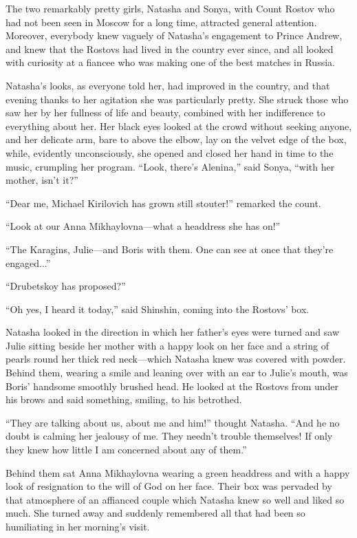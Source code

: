 The two remarkably pretty girls, Natasha and Sonya, with Count
Rostov who had not been seen in Moscow for a long time, attracted
general attention. Moreover, everybody knew vaguely of Natasha's
engagement to Prince Andrew, and knew that the Rostovs had lived
in the country ever since, and all looked with curiosity at a
fiancee who was making one of the best matches in Russia.

Natasha's looks, as everyone told her, had improved in the
country, and that evening thanks to her agitation she was
particularly pretty. She struck those who saw her by her fullness
of life and beauty, combined with her indifference to everything
about her. Her black eyes looked at the crowd without seeking
anyone, and her delicate arm, bare to above the elbow, lay on the
velvet edge of the box, while, evidently unconsciously, she
opened and closed her hand in time to the music, crumpling her
program. ``Look, there's Alenina,'' said Sonya, ``with her
mother, isn't it?''

``Dear me, Michael Kirilovich has grown still stouter!'' remarked
the count.

``Look at our Anna Mikhaylovna---what a headdress she has on!''

``The Karagins, Julie---and Boris with them. One can see at once
that they're engaged...''

``Drubetskoy has proposed?''

``Oh yes, I heard it today,'' said Shinshin, coming into the
Rostovs' box.

Natasha looked in the direction in which her father's eyes were
turned and saw Julie sitting beside her mother with a happy look
on her face and a string of pearls round her thick red
neck---which Natasha knew was covered with powder. Behind them,
wearing a smile and leaning over with an ear to Julie's mouth,
was Boris' handsome smoothly brushed head. He looked at the
Rostovs from under his brows and said something, smiling, to his
betrothed.

``They are talking about us, about me and him!'' thought
Natasha. ``And he no doubt is calming her jealousy of me. They
needn't trouble themselves!  If only they knew how little I am
concerned about any of them.''

Behind them sat Anna Mikhaylovna wearing a green headdress and
with a happy look of resignation to the will of God on her
face. Their box was pervaded by that atmosphere of an affianced
couple which Natasha knew so well and liked so much. She turned
away and suddenly remembered all that had been so humiliating in
her morning's visit.

